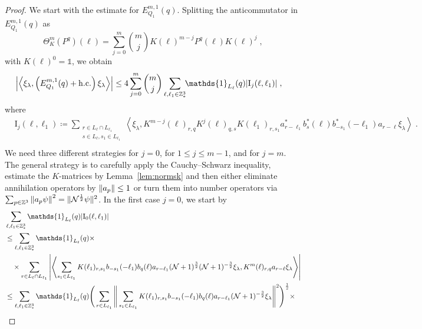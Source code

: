 \documentclass[12pt,a4paper]{article}
\numberwithin{equation}{section}
\newcommand{\cN}{\mathcal{N}}
\newcommand{\1}{\mathbb{I}}
\newcommand{\I}{\mathrm{I}}
\newcommand{\Z}{\mathbb{Z}}
\newcommand{\NN}{\mathcal{N}}
\newcommand{\half}{\frac{1}{2}}
\newcommand{\eva}[1]{\left\langle #1 \right\rangle}
\theoremstyle{plain}
\theoremstyle{definition}
\theoremstyle{remark}
\theoremstyle{plain}
\theoremstyle{definition}
\theoremstyle{remark}
\begin{document}
\begin{proof}
We start with the estimate for $ E^{m,1}_{Q_1}(q) $. Splitting the anticommutator in $ E^{m,1}_{Q_1}(q) $ as
\begin{equation} \label{eq:q-q}
	\Theta^m_K(P^q)(\ell)
	= \sum_{j=0}^m {{m}\choose j} K(\ell)^{m-j} P^q(\ell) K(\ell)^{j} \;,
\end{equation}
with $ K(\ell)^0 = \mathds{1} $, we obtain
\begin{equation} \label{eq:EQ1111}
\begin{aligned}
	& \abs{\eva{\xi_\lambda,\left(E^{m,1}_{Q_1}(q) + \mathrm{h.c.}\right) \xi_\lambda }}
	\le 4 \sum_{j=0}^m {{m}\choose j} \sum_{\ell,\ell_1  \in \Z^3_*}\!\! \mathds{1}_{L_\ell}(q) | \I_j(\ell, \ell_1)| \;,
	\end{aligned}
\end{equation}
where
\begin{equation}
\begin{aligned}
& 	\I_j(\ell, \ell_1)
	\coloneq \sum_{\substack{r\in L_{\ell} \cap L_{\ell_1}\\ s \in L_{\ell},s_1\in L_{\ell_1}}}
		\eva{\xi_\lambda, K^{m-j}(\ell)_{r,q} K^{j}(\ell)_{q,s} K(\ell_1)_{r,s_1} a^*_{r-\ell_1} b^*_{s}(\ell) b^*_{-s_1}(-\ell_1) a_{r-\ell} \xi_\lambda} \;. \\
\end{aligned}
\end{equation}
We need three different strategies for $ j = 0 $, for $ 1 \le j \le m-1 $, and for $ j = m $. The general strategy is to carefully apply the Cauchy--Schwarz inequality, estimate the $ K $-matrices by Lemma~\ref{lem:normsk} and then either eliminate annihilation operators by $ \norm{a_p} \le 1 $ or turn them into number operators via $ \sum_{p \in \Z^3} \norm{a_p \psi}^2 = \Vert \cN^{\half} \psi \Vert^2 $. In the first case $ j = 0 $, we start by
\begin{align}
	&\sum_{\ell,\ell_1 \in \Z^3_*} \mathds{1}_{L_\ell}(q) |\I_0(\ell, \ell_1)| \nonumber\\
	&\le \sum_{\ell,\ell_1 \in \Z^3_*} \mathds{1}_{L_\ell}(q) \times \nonumber\\
	&\quad \times \sum\limits_{r \in L_\ell \cap L_{\ell_1}} \abs{\eva{ \sum\limits_{s_1 \in L_{\ell_1}} K(\ell_1)_{r,s_1} b_{-s_1}(-\ell_1) b_{q}(\ell) a_{r-\ell_1} (\NN+1)^{\frac 32} (\NN+1)^{-\frac 32} \xi_\lambda, K^{m}(\ell)_{r,q} a_{r-\ell} \xi_\lambda }}\nonumber\\
	&\leq \sum_{\ell,\ell_1 \in \Z^3_*} \mathds{1}_{L_\ell}(q) \Bigg( \sum\limits_{r \in L_{\ell_1}} \Bigg\Vert \sum\limits_{s_1 \in L_{\ell_1}} K(\ell_1)_{r,s_1} b_{-s_1}(-\ell_1) b_{q}(\ell) a_{r-\ell_1} (\NN+1)^{-\frac 32}\xi_\lambda \Bigg\Vert^2\Bigg)^\half \times\nonumber\\

\end{align}
\end{proof}
\end{document}
